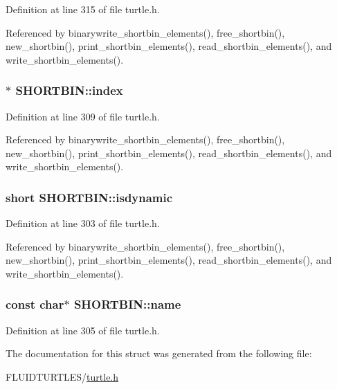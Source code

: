 Definition at line 315 of file turtle.\-h.



Referenced by binarywrite\-\_\-shortbin\-\_\-elements(), free\-\_\-shortbin(), new\-\_\-shortbin(), print\-\_\-shortbin\-\_\-elements(), read\-\_\-shortbin\-\_\-elements(), and write\-\_\-shortbin\-\_\-elements().

\hypertarget{struct_s_h_o_r_t_b_i_n_a9dfc172443543d0ae3175ade6effc6b3}{
\subsubsection[{index}]{$\ast$ S\-H\-O\-R\-T\-B\-I\-N\-::index}}\label{struct_s_h_o_r_t_b_i_n_a9dfc172443543d0ae3175ade6effc6b3}


Definition at line 309 of file turtle.\-h.



Referenced by binarywrite\-\_\-shortbin\-\_\-elements(), free\-\_\-shortbin(), new\-\_\-shortbin(), print\-\_\-shortbin\-\_\-elements(), read\-\_\-shortbin\-\_\-elements(), and write\-\_\-shortbin\-\_\-elements().

\hypertarget{struct_s_h_o_r_t_b_i_n_a9b3e88c54f5acc347e5690e7a6ae7465}{
\subsubsection[{isdynamic}]{\setlength{\rightskip}{0pt plus 5cm}short S\-H\-O\-R\-T\-B\-I\-N\-::isdynamic}}\label{struct_s_h_o_r_t_b_i_n_a9b3e88c54f5acc347e5690e7a6ae7465}


Definition at line 303 of file turtle.\-h.



Referenced by binarywrite\-\_\-shortbin\-\_\-elements(), free\-\_\-shortbin(), new\-\_\-shortbin(), print\-\_\-shortbin\-\_\-elements(), read\-\_\-shortbin\-\_\-elements(), and write\-\_\-shortbin\-\_\-elements().

\hypertarget{struct_s_h_o_r_t_b_i_n_a6577de7330231f1d8df394f3e198253d}{
\subsubsection[{name}]{\setlength{\rightskip}{0pt plus 5cm}const char$\ast$ S\-H\-O\-R\-T\-B\-I\-N\-::name}}\label{struct_s_h_o_r_t_b_i_n_a6577de7330231f1d8df394f3e198253d}


Definition at line 305 of file turtle.\-h.



The documentation for this struct was generated from the following file\-:\begin{DoxyCompactItemize}
\item 
F\-L\-U\-I\-D\-T\-U\-R\-T\-L\-E\-S/\hyperlink{turtle_8h}{turtle.\-h}\end{DoxyCompactItemize}
